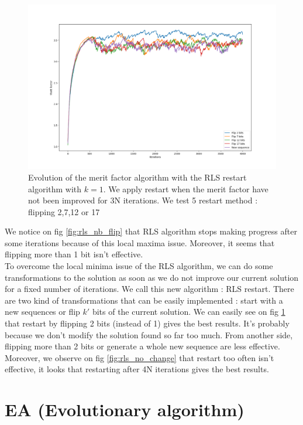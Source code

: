 \documentclass[a4paper,11pt,openany]{article}
\begin{document}
\begin{figure}[H]
\begin{center}
\includegraphics[scale=0.25]{Images/rls_restart}
\caption{Evolution of the merit factor algorithm with the RLS restart algorithm with $k=1$. We apply restart when the merit factor have not been improved for 3N iterations. We test 5 restart method : flipping 2,7,12 or 17}
\label{fig:rls_restart}
\end{center}
\end{figure}
\noindent
We notice on fig \ref{fig:rls_nb_flip} that RLS algorithm stops making progress after some iterations because of this local maxima issue. Moreover, it seems that flipping more than 1 bit isn't effective.\\
To overcome the local minima issue of the RLS algorithm, we can do some transformations to the solution as soon as we do not improve our current solution for a fixed number of iterations. We call this new algorithm : RLS restart. There are two kind of transformations that can be easily implemented : start with a new sequences or flip $k'$ bits of the current solution. We can easily see on fig \ref{fig:rls_restart} that restart by flipping 2 bits (instead of 1) gives the best results. It's probably because we don't modify the solution found so far too much. From another side, flipping more than 2 bits or generate a whole new sequence are less effective. Moreover, we observe on fig \ref{fig:rls_no_change} that restart too often isn't effective, it looks that restarting after 4N iterations gives the best results.
\section{EA (Evolutionary algorithm)}
\end{document}
